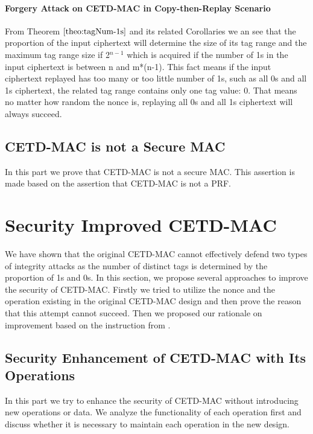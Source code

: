 \paragraph{Forgery Attack on CETD-MAC in Copy-then-Replay Scenario}
From Theorem $\ref{theo:tagNum-1s}$ and its related Corollaries we an see that the proportion of the input ciphertext will determine the size of its tag range and the maximum tag range size if 2$^{n-1}$ which is acquired if the number of 1s in the input ciphertext is between n and m*(n-1).
This fact means if the input ciphertext replayed has too many or too little number of 1s, such as all 0s and all 1s ciphertext, the related tag range contains only one tag value: 0. That means no matter how random the nonce is, replaying all 0s and all 1s ciphertext will always succeed.

\subsection{CETD-MAC is not a Secure MAC}
In this part we prove that CETD-MAC is not a secure MAC. This assertion is made
based on the assertion that CETD-MAC is not a PRF.

\section{Security Improved CETD-MAC}
We have shown that the original CETD-MAC cannot effectively defend two types of integrity attacks as the number of distinct tags is determined by the proportion of 1s and 0s. In this section, we propose several approaches to improve the security of CETD-MAC. Firstly we tried to utilize the nonce and the operation existing in the original CETD-MAC design and then prove the reason that this attempt cannot succeed. Then we proposed our rationale on improvement based on the instruction from \cite{}.  
\subsection{Security Enhancement of CETD-MAC with Its Operations}\label{sect:pattern}
In this part we try to enhance the security of CETD-MAC without introducing new operations or data. We analyze the functionality of each operation first and discuss whether it is necessary to maintain each operation in the new design.
